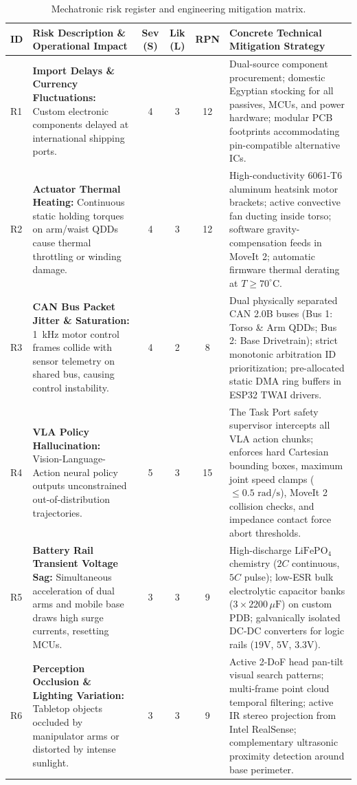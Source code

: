 \begin{table}[htbp]
\centering\footnotesize
\caption{Mechatronic risk register and engineering mitigation matrix.}
\label{tab:risk_register}
\begin{tabularx}{\textwidth}{@{}l p{3.2cm} c c c Y@{}}
\toprule
\textbf{ID} & \textbf{Risk Description \& Operational Impact} & \textbf{Sev (S)} & \textbf{Lik (L)} & \textbf{RPN} & \textbf{Concrete Technical Mitigation Strategy} \\
\midrule
R1 & 
\textbf{Import Delays \& Currency Fluctuations:} Custom electronic components delayed at international shipping ports. & 
4 & 3 & 12 & 
Dual-source component procurement; domestic Egyptian stocking for all passives, MCUs, and power hardware; modular PCB footprints accommodating pin-compatible alternative ICs. \\
\addlinespace[3pt]
R2 & 
\textbf{Actuator Thermal Heating:} Continuous static holding torques on arm/waist QDDs cause thermal throttling or winding damage. & 
4 & 3 & 12 & 
High-conductivity 6061-T6 aluminum heatsink motor brackets; active convective fan ducting inside torso; software gravity-compensation feeds in MoveIt 2; automatic firmware thermal derating at $T \ge 70^\circ\text{C}$. \\
\addlinespace[3pt]
R3 & 
\textbf{CAN Bus Packet Jitter \& Saturation:} 1~kHz motor control frames collide with sensor telemetry on shared bus, causing control instability. & 
4 & 2 & 8 & 
Dual physically separated CAN 2.0B buses (Bus 1: Torso \& Arm QDDs; Bus 2: Base Drivetrain); strict monotonic arbitration ID prioritization; pre-allocated static DMA ring buffers in ESP32 TWAI drivers. \\
\addlinespace[3pt]
R4 & 
\textbf{VLA Policy Hallucination:} Vision-Language-Action neural policy outputs unconstrained out-of-distribution trajectories. & 
5 & 3 & 15 & 
The Task Port safety supervisor intercepts all VLA action chunks; enforces hard Cartesian bounding boxes, maximum joint speed clamps ($\le 0.5\text{ rad/s}$), MoveIt 2 collision checks, and impedance contact force abort thresholds. \\
\addlinespace[3pt]
R5 & 
\textbf{Battery Rail Transient Voltage Sag:} Simultaneous acceleration of dual arms and mobile base draws high surge currents, resetting MCUs. & 
3 & 3 & 9 & 
High-discharge $\text{LiFePO}_4$ chemistry ($2C$ continuous, $5C$ pulse); low-ESR bulk electrolytic capacitor banks ($3 \times 2200\,\mu\text{F}$) on custom PDB; galvanically isolated DC-DC converters for logic rails ($19\text{V}$, $5\text{V}$, $3.3\text{V}$). \\
\addlinespace[3pt]
R6 & 
\textbf{Perception Occlusion \& Lighting Variation:} Tabletop objects occluded by manipulator arms or distorted by intense sunlight. & 
3 & 3 & 9 & 
Active 2-DoF head pan-tilt visual search patterns; multi-frame point cloud temporal filtering; active IR stereo projection from Intel RealSense; complementary ultrasonic proximity detection around base perimeter. \\
\bottomrule
\end{tabularx}
\end{table}

